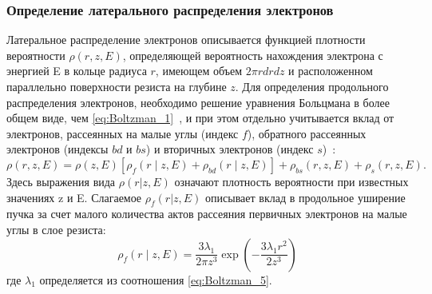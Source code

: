 \subsubsection{Определение латерального распределения электронов}
Латеральное распределение электронов описывается функцией плотности вероятности $\rho(r, z, E)$, определяющей вероятность нахождения электрона с энергией E в кольце радиуса $r$, имеющем объем $2 \pi r dr dz$ и расположенном параллельно поверхности резиста на глубине $z$. Для определения продольного распределения электронов, необходимо решение уравнения Больцмана в более общем виде, чем \ref{eq:Boltzman_1}~\cite{ME_rev_63}, и при этом отдельно учитывается вклад от электронов, рассеянных на малые углы (индекс $f$), обратного рассеянных электронов (индексы $bd$ и $bs$) и вторичных электронов (индекс $s$)~\cite{ME_rev_64}:
\begin{equation} \label{eq:Boltzman_10}
	\rho(r, z, E)=\rho(z, E)\left[\rho_f(r \mid z, E)+\rho_{b d}(r \mid z, E)\right]+\rho_{b s}(r, z, E)+\rho_s(r, z, E).
\end{equation}
Здесь выражения вида $\rho(r|z,E)$ означают плотность вероятности при известных значениях z и E. Слагаемое $\rho_f(r|z,E)$ описывает вклад в продольное уширение пучка за счет малого количества актов рассеяния первичных электронов на малые углы в слое резиста:
\begin{equation} \label{eq:Boltzman_11}
	\rho_f(r \mid z, E)=\frac{3 \lambda_1}{2 \pi z^3} \exp \left(-\frac{3 \lambda_1 r^2}{2 z^3}\right)
\end{equation}
где $\lambda_1$ определяется из соотношения \ref{eq:Boltzman_5}.

